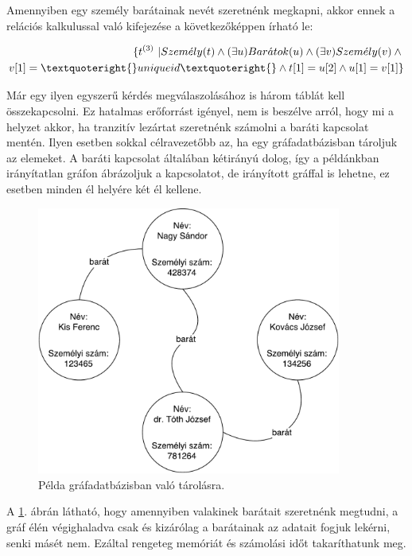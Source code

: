 Amennyiben egy személy barátainak nevét szeretnénk megkapni, akkor ennek a relációs kalkulussal való kifejezése a következőképpen írható le:

\begin{equation}
\begin{split}
\{t^{(3)}\ | Szem\acute{e}ly(t) \wedge{} (\exists{}u)Bar\acute{a}tok(u) \wedge{} (\exists{}v)Szem\acute{e}ly(v) \wedge{} \\ v[1] = \textquoteright{}uniqueid\textquoteright{} \wedge{} 
t[1]=u[2] \wedge{}u[1]=v[1]      \}
\end{split}
\end{equation}

Már egy ilyen egyszerű kérdés megválaszolásához is három táblát kell összekapcsolni. Ez hatalmas erőforrást igényel, nem is beszélve arról, hogy mi a helyzet akkor, ha tranzitív lezártat szeretnénk számolni a baráti kapcsolat mentén. Ilyen esetben sokkal célravezetőbb az, ha egy gráfadatbázisban tároljuk az elemeket. A baráti kapcsolat általában kétirányú dolog, így a példánkban irányítatlan gráfon ábrázoljuk a kapcsolatot, de irányított gráffal is lehetne, ez esetben minden él helyére két él kellene.

\begin{figure}[H]
	\centering
	\includegraphics[width=100mm]{figures/GrafadatbazisPelda.pdf}
	\caption{Példa gráfadatbázisban való tárolásra.}
	\label{fig:grafPelda}
\end{figure}

A \ref{fig:grafPelda}. ábrán látható, hogy amennyiben valakinek barátait szeretnénk megtudni, a gráf élén végighaladva csak és kizárólag a barátainak az adatait fogjuk lekérni, senki másét nem. Ezáltal rengeteg memóriát és számolási időt takaríthatunk meg.